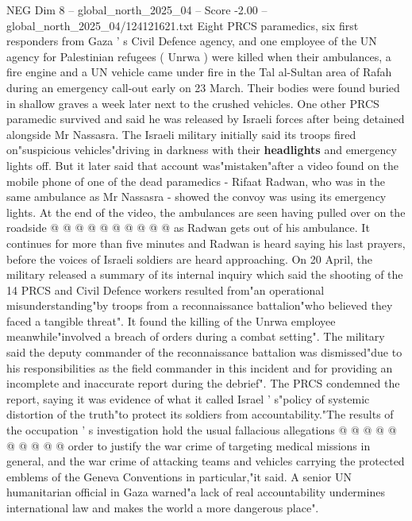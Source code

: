 \begin{textsample}{NEG Dim 8 – global\_north\_2025\_04 – Score -2.00 – global\_north\_2025\_04/124121621.txt}  \label{ex:f8_neg_089}
Eight PRCS paramedics, six first responders from Gaza ' s Civil Defence agency, and one employee of the UN agency for Palestinian refugees ( Unrwa ) were killed when their ambulances, a fire engine and a UN vehicle came under fire in the Tal al-Sultan area of Rafah during an emergency call-out early on 23 March.
Their bodies were found buried in shallow graves a week later next to the crushed vehicles.
One other PRCS paramedic survived and said he was released by Israeli forces after being detained alongside Mr Nassasra.
The Israeli military initially said its troops fired on"suspicious vehicles"driving in darkness with their \textbf{headlights} and emergency lights off.
But it later said that account was"mistaken"after a video found on the mobile phone of one of the dead paramedics - Rifaat Radwan, who was in the same ambulance as Mr Nassasra - showed the convoy was using its emergency lights.
At the end of the video, the ambulances are seen having pulled over on the roadside @ @ @ @ @ @ @ @ @ @ as Radwan gets out of his ambulance.
It continues for more than five minutes and Radwan is heard saying his last prayers, before the voices of Israeli soldiers are heard approaching.
On 20 April, the military released a summary of its internal inquiry which said the shooting of the 14 PRCS and Civil Defence workers resulted from"an operational misunderstanding"by troops from a reconnaissance battalion"who believed they faced a tangible threat".
It found the killing of the Unrwa employee meanwhile"involved a breach of orders during a combat setting".
The military said the deputy commander of the reconnaissance battalion was dismissed"due to his responsibilities as the field commander in this incident and for providing an incomplete and inaccurate report during the debrief".
The PRCS condemned the report, saying it was evidence of what it called Israel ' s"policy of systemic distortion of the truth"to protect its soldiers from accountability."The results of the occupation ' s investigation hold the usual fallacious allegations @ @ @ @ @ @ @ @ @ @ order to justify the war crime of targeting medical missions in general, and the war crime of attacking teams and vehicles carrying the protected emblems of the Geneva Conventions in particular,"it said.
A senior UN humanitarian official in Gaza warned"a lack of real accountability undermines international law and makes the world a more dangerous place".

\end{textsample}
